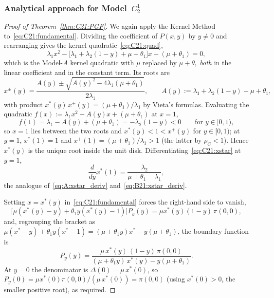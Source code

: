 \subsubsection{Analytical approach for Model~\texorpdfstring{$C_2^1$}{C21}}\label{sssec:C21:analytical}

\begin{proof}[Proof of Theorem~\ref{thm:C21:PGF}]
We again apply the Kernel Method to~\eqref{eq:C21:fundamental}. Dividing the coefficient of
$P(x,y)$ by $y\ne0$ and rearranging gives the kernel quadratic~\eqref{eq:C21:quad},
\begin{equation*}
    \lambda_1 x^2 - \bigl[\lambda_1+\lambda_2(1-y)+\mu+\theta_1\bigr]x + (\mu+\theta_1) = 0,
\end{equation*}
which is the Model-$A$ kernel quadratic with $\mu$ replaced by $\mu+\theta_1$ \emph{both} in
the linear coefficient and in the constant term. Its roots are
\begin{equation}
    x^{\pm}(y) = \frac{A(y) \pm \sqrt{A(y)^2 - 4\lambda_1(\mu+\theta_1)}}{2\lambda_1},
    \qquad A(y):=\lambda_1+\lambda_2(1-y)+\mu+\theta_1,
    \label{eq:C21:xstar}
\end{equation}
with product $x^*(y)\,x^+(y)=(\mu+\theta_1)/\lambda_1$ by Vieta's formulas. Evaluating the
quadratic $f(x):=\lambda_1 x^2-A(y)x+(\mu+\theta_1)$ at $x=1$,
\begin{equation*}
    f(1) = \lambda_1 - A(y) + (\mu+\theta_1) = -\lambda_2(1-y) < 0
    \qquad\text{for } y\in[0,1),
\end{equation*}
so $x=1$ lies between the two roots and $x^*(y)<1<x^+(y)$ for $y\in[0,1)$; at $y=1$,
$x^*(1)=1$ and $x^+(1)=(\mu+\theta_1)/\lambda_1>1$ (the latter by $\rho_C<1$). Hence $x^*(y)$
is the unique root inside the unit disk. Differentiating~\eqref{eq:C21:xstar} at $y=1$,
\begin{equation}
    \frac{d}{dy}x^*(1) = \frac{\lambda_2}{\mu+\theta_1-\lambda_1},
    \label{eq:C21:xstar_deriv}
\end{equation}
the analogue of~\eqref{eq:A:xstar_deriv} and~\eqref{eq:B21:xstar_deriv}.

Setting $x=x^*(y)$ in~\eqref{eq:C21:fundamental} forces the right-hand side to vanish,
\begin{equation*}
    \bigl[\mu(x^*(y)-y)+\theta_1 y(x^*(y)-1)\bigr]P_y(y) = \mu x^*(y)(1-y)\,\pi(0,0),
\end{equation*}
and, regrouping the bracket as
$\mu(x^*-y)+\theta_1 y(x^*-1)=(\mu+\theta_1 y)x^*-y(\mu+\theta_1)$, the boundary function is
\begin{equation}
    P_y(y) = \frac{\mu\,x^*(y)\,(1-y)\,\pi(0,0)}
                  {(\mu+\theta_1 y)\,x^*(y)-y(\mu+\theta_1)}.
    \label{eq:C21:Py}
\end{equation}
At $y=0$ the denominator is $\Delta(0)=\mu\,x^*(0)$, so
$P_y(0)=\mu x^*(0)\pi(0,0)/(\mu\,x^*(0))=\pi(0,0)$ (using $x^*(0)>0$, the smaller positive
root), as required.


\end{proof}
